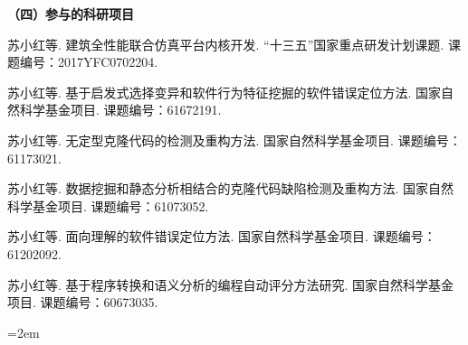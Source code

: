\noindent\textbf{（四）参与的科研项目}
\begin{publist}

\item
苏小红等. 建筑全性能联合仿真平台内核开发. “十三五”国家重点研发计划课题. 课题编号：2017YFC0702204.
\item	
苏小红等. 基于启发式选择变异和软件行为特征挖掘的软件错误定位方法. 国家自然科学基金项目. 课题编号：61672191.
\item	
苏小红等. 无定型克隆代码的检测及重构方法. 国家自然科学基金项目. 课题编号：61173021.
\item
苏小红等. 数据挖掘和静态分析相结合的克隆代码缺陷检测及重构方法. 国家自然科学基金项目. 课题编号：61073052.
\item
苏小红等. 面向理解的软件错误定位方法. 国家自然科学基金项目. 课题编号：61202092.

\item
苏小红等. 基于程序转换和语义分析的编程自动评分方法研究. 国家自然科学基金项目. 课题编号：60673035.

\end{publist}
\vfill
{}\hangindent=2em\noindent

\setlength{\parindent}{2em}
